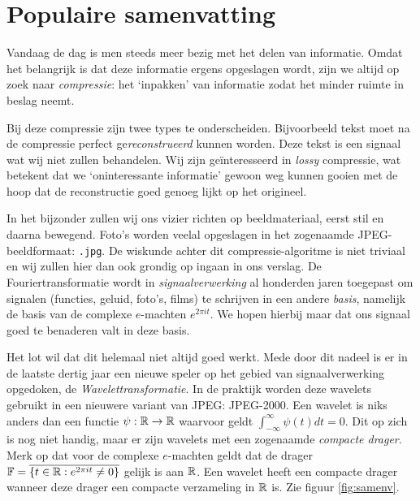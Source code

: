 \chapter{Populaire samenvatting}

Vandaag de dag is men steeds meer bezig met het delen van informatie. Omdat het belangrijk is dat deze informatie ergens opgeslagen wordt, zijn we altijd op zoek naar \emph{compressie}: het `inpakken' van informatie zodat het minder ruimte in beslag neemt.

Bij deze compressie zijn twee types te onderscheiden. Bijvoorbeeld tekst moet na de compressie perfect ge\emph{reconstrueerd} kunnen worden. Deze tekst is een signaal wat wij niet zullen behandelen. Wij zijn ge\"interesseerd in \emph{lossy} compressie, wat betekent dat we `oninteressante informatie' gewoon weg kunnen gooien met de hoop dat de reconstructie goed genoeg lijkt op het origineel.

In het bijzonder zullen wij ons vizier richten op beeldmateriaal, eerst stil en daarna bewegend. Foto's worden veelal opgeslagen in het zogenaamde JPEG-beeldformaat: \texttt{.jpg}. De wiskunde achter dit compressie-algoritme is niet triviaal en wij zullen hier dan ook grondig op ingaan in ons verslag. De Fouriertransformatie wordt in \emph{signaalverwerking} al honderden jaren toegepast om signalen (functies, geluid, foto's, films) te schrijven in een andere \emph{basis}, namelijk de basis van de complexe $e$-machten $e^{2 \pi i t}$. We hopen hierbij maar dat ons signaal goed te benaderen valt in deze basis.

Het lot wil dat dit helemaal niet altijd goed werkt. Mede door dit nadeel is er in de laatste dertig jaar een nieuwe speler op het gebied van signaalverwerking opgedoken, de \mbox{\emph{Wavelettransformatie}}. In de praktijk worden deze wavelets gebruikt in een nieuwere variant van JPEG: JPEG-2000. Een wavelet is niks anders dan een functie $\psi: \mathbb{R} \to \mathbb{R}$ waarvoor geldt $\int_{-\infty}^\infty \psi(t) dt = 0$. Dit op zich is nog niet handig, maar er zijn wavelets met een zogenaamde \emph{compacte drager}. Merk op dat voor de complexe $e$-machten geldt dat de drager $\mathbb{F} = \overline{\{ t \in \mathbb{R}: e^{2 \pi i t} \not= 0 \}}$ gelijk is aan $\mathbb{R}$. Een wavelet heeft een compacte drager wanneer deze drager een compacte verzameling in $\mathbb{R}$ is. Zie figuur \ref{fig:samenv}.

